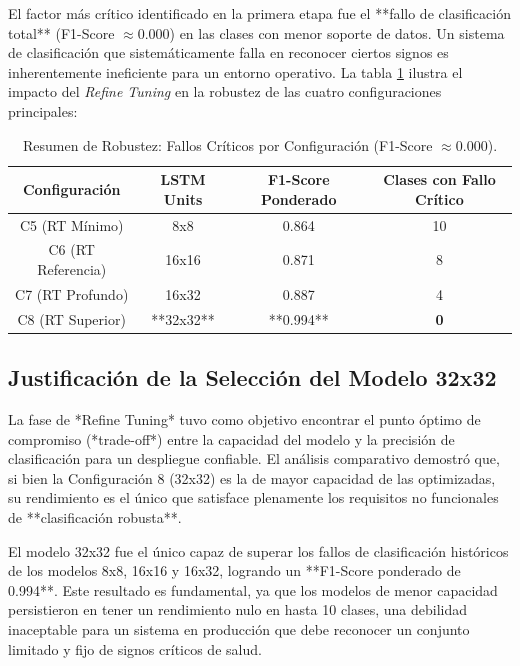 El factor más crítico identificado en la primera etapa fue el **fallo de clasificación total** (F1-Score $\approx 0.000$) en las clases con menor soporte de datos. Un sistema de clasificación que sistemáticamente falla en reconocer ciertos signos es inherentemente ineficiente para un entorno operativo. La tabla \ref{tab:resumen_robutez} ilustra el impacto del \textit{Refine Tuning} en la robustez de las cuatro configuraciones principales:

\begin{table}[!h]
    \centering
    \caption{Resumen de Robustez: Fallos Críticos por Configuración (F1-Score $\approx 0.000$).}
    \label{tab:resumen_robutez}
    \begin{tabular}{|c|c|c|c|}
        \hline
        \textbf{Configuración} & \textbf{LSTM Units} & \textbf{F1-Score Ponderado} & \textbf{Clases con Fallo Crítico} \\
        \hline
        C5 (RT Mínimo) & 8x8 & 0.864 & 10 \\
        C6 (RT Referencia) & 16x16 & 0.871 & 8 \\
        C7 (RT Profundo) & 16x32 & 0.887 & 4 \\
        C8 (RT Superior) & **32x32** & **0.994** & \textbf{0} \\
        \hline
    \end{tabular}
\end{table}

\subsection{Justificación de la Selección del Modelo 32x32}

La fase de *Refine Tuning* tuvo como objetivo encontrar el punto óptimo de compromiso (*trade-off*) entre la capacidad del modelo y la precisión de clasificación para un despliegue confiable. El análisis comparativo demostró que, si bien la Configuración 8 (32x32) es la de mayor capacidad de las optimizadas, su rendimiento es el único que satisface plenamente los requisitos no funcionales de **clasificación robusta**.

El modelo 32x32 fue el único capaz de superar los fallos de clasificación históricos de los modelos 8x8, 16x16 y 16x32, logrando un **F1-Score ponderado de 0.994**. Este resultado es fundamental, ya que los modelos de menor capacidad persistieron en tener un rendimiento nulo en hasta 10 clases, una debilidad inaceptable para un sistema en producción que debe reconocer un conjunto limitado y fijo de signos críticos de salud.

